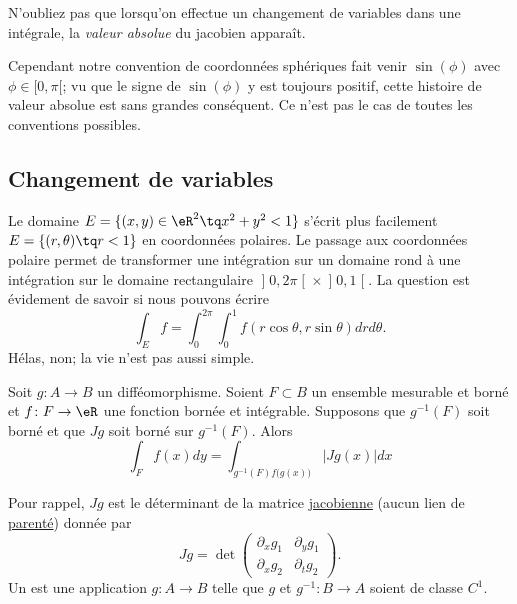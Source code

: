 N'oubliez pas que lorsqu'on effectue un changement de variables dans une intégrale, la \emph{valeur absolue} du jacobien apparaît.

Cependant notre convention de coordonnées sphériques fait venir \( \sin(\phi)\) avec \( \phi\in\mathopen[ 0 , \pi [\); vu que le signe de \( \sin(\phi)\) y est toujours positif, cette histoire de valeur absolue est sans grandes conséquent. Ce n'est pas le cas de toutes les conventions possibles.

					\subsection{Changement de variables}

Le domaine $E=\{ (x,y)\in\eR^2\tq x^2+y^2<1 \}$ s'écrit plus facilement $E=\{ (r,\theta)\tq r<1 \}$ en coordonnées polaires. Le passage aux coordonnées polaire permet de transformer une intégration sur un domaine rond à une intégration sur le domaine rectangulaire $\mathopen]0,2\pi\mathclose[\times\mathopen]0,1\mathclose[$. La question est évidement de savoir si nous pouvons écrire
\begin{equation}
	\int_Ef=\int_{0}^{2\pi}\int_0^1f(r\cos\theta,r\sin\theta)drd\theta.
\end{equation}
Hélas, non; la vie n'est pas aussi simple.

\begin{theorem}
Soit $g\colon A\to B$ un difféomorphisme. Soient $F\subset B$ un ensemble mesurable et borné et $f\colon F\to \eR$ une fonction bornée et intégrable. Supposons que $g^{-1}(F)$ soit borné et que $Jg$ soit borné sur $g^{-1}(F)$. Alors
\begin{equation}
	\int_Ff(x)dy=\int_{g^{-1}(F)f\big( g(x) \big)}| Jg(x) |dx
\end{equation}
\end{theorem}
Pour rappel, $Jg$ est le déterminant de la matrice \href{http://fr.wikipedia.org/wiki/Matrice_jacobienne}{jacobienne} (aucun lien de \href{http://fr.wikipedia.org/wiki/Jacob}{parenté}) donnée par
\begin{equation}
	Jg=\det\begin{pmatrix}
	\partial_xg_1	&	\partial_yg_1	\\ 
	\partial_xg_2	&	\partial_tg_2	
\end{pmatrix}.
\end{equation}
Un  est une application $g\colon A\to B$ telle que $g$ et $g^{-1}\colon B\to A$ soient de classe $C^1$.

